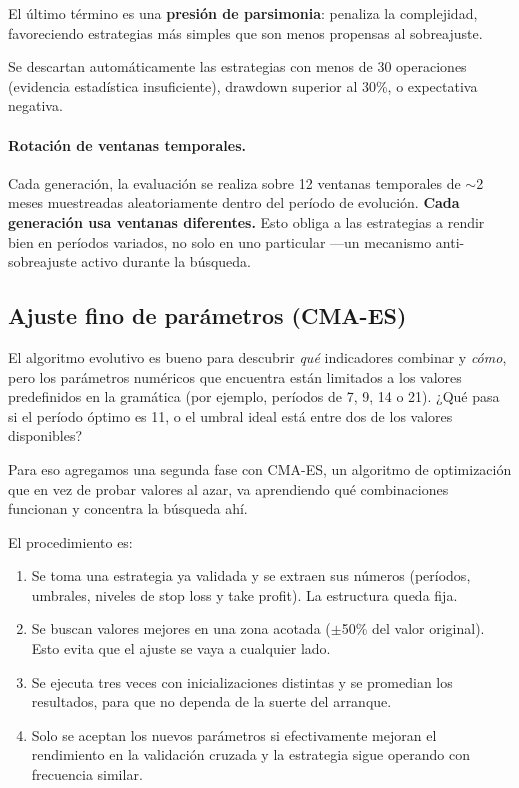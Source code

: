 \documentclass[12pt,a4paper]{article}
\begin{document}
El último término es una \textbf{presión de parsimonia}: penaliza la complejidad,
favoreciendo estrategias más simples que son menos propensas al sobreajuste.

Se descartan automáticamente las estrategias con menos de 30 operaciones (evidencia
estadística insuficiente), drawdown superior al 30\%, o expectativa negativa.

\paragraph{Rotación de ventanas temporales.} Cada generación, la evaluación se realiza
sobre 12 ventanas temporales de $\sim$2 meses muestreadas aleatoriamente dentro del
período de evolución. \textbf{Cada generación usa ventanas diferentes.} Esto obliga a
las estrategias a rendir bien en períodos variados, no solo en uno particular ---un
mecanismo anti-sobreajuste activo durante la búsqueda.

\subsection{Ajuste fino de parámetros (CMA-ES)}
\label{sec:cmaes}

El algoritmo evolutivo es bueno para descubrir \textit{qué} indicadores combinar y
\textit{cómo}, pero los parámetros numéricos que encuentra están limitados a los
valores predefinidos en la gramática (por ejemplo, períodos de 7, 9, 14 o 21).
¿Qué pasa si el período óptimo es 11, o el umbral ideal está entre dos de los
valores disponibles?

Para eso agregamos una segunda fase con CMA-ES, un algoritmo de optimización que
en vez de probar valores al azar, va aprendiendo qué combinaciones funcionan y
concentra la búsqueda ahí.

El procedimiento es:

\begin{enumerate}
\item Se toma una estrategia ya validada y se extraen sus números (períodos, umbrales,
  niveles de stop loss y take profit). La estructura queda fija.

\item Se buscan valores mejores en una zona acotada ($\pm$50\% del valor original).
  Esto evita que el ajuste se vaya a cualquier lado.

\item Se ejecuta tres veces con inicializaciones distintas y se promedian los
  resultados, para que no dependa de la suerte del arranque.

\item Solo se aceptan los nuevos parámetros si efectivamente mejoran el rendimiento
  en la validación cruzada y la estrategia sigue operando con frecuencia similar.
\end{enumerate}
\end{document}
